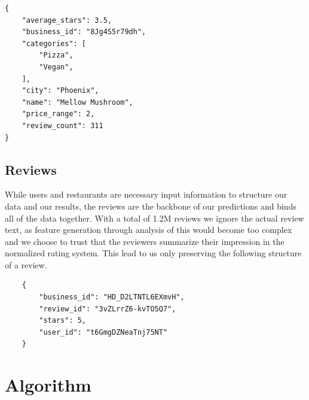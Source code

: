 \documentclass[10pt,twocolumn,letterpaper]{article}
\begin{document}
\begin{verbatim}
{
    "average_stars": 3.5,
    "business_id": "8Jg4S5r79dh",
    "categories": [
        "Pizza",
        "Vegan",
    ],
    "city": "Phoenix",
    "name": "Mellow Mushroom",
    "price_range": 2,
    "review_count": 311
}
\end{verbatim}

\subsection{Reviews}
While users and restaurants are necessary input information to structure our data and our results, the reviews are the backbone of our predictions and binds all of the data together. With a total of 1.2M reviews we ignore the actual review text, as feature generation through analysis of this would become too complex and we choose to trust that the reviewers summarize their impression in the normalized rating system. This lead to us only preserving the following structure of a review.

\begin{verbatim}
	{
	    "business_id": "HD_D2LTNTL6EXmvH",
	    "review_id": "3vZLrrZ6-kvTO5Q7",
	    "stars": 5,
	    "user_id": "t6GmgDZNeaTnj75NT"
	}
\end{verbatim}


\section{Algorithm}
\end{document}
